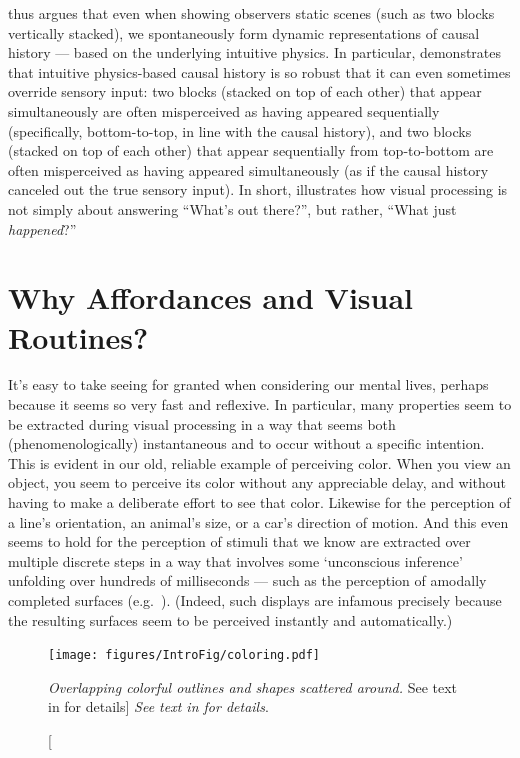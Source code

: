  thus argues that even when showing observers static scenes (such as two blocks vertically stacked), we spontaneously form dynamic representations of causal history --- based on the underlying intuitive physics. In particular,  demonstrates that intuitive physics-based causal history is so robust that it can even sometimes override sensory input: two blocks (stacked on top of each other) that appear simultaneously are often misperceived as having appeared sequentially (specifically, bottom-to-top, in line with the causal history), and two blocks (stacked on top of each other) that appear sequentially from top-to-bottom are often misperceived as having appeared simultaneously (as if the causal history canceled out the true sensory input).  In short,  illustrates how visual processing is not simply about answering “What’s out there?”, but rather, “What just \textit{happened}?”


\section{Why Affordances and Visual Routines?}\label{sec:why_visual_routines}
It’s easy to take seeing for granted when considering our mental lives, perhaps because it seems so very fast and reflexive.  In particular, many properties seem to be extracted during visual processing in a way that seems both (phenomenologically) instantaneous and to occur without a specific intention.   This is evident in our old, reliable example of perceiving color.  When you view an object, you seem to perceive its color without any appreciable delay, and without having to make a deliberate effort to see that color.  Likewise for the perception of a line’s orientation, an animal’s size, or a car’s direction of motion.  And this even seems to hold for the perception of stimuli that we know are extracted over multiple discrete steps in a way that involves some ‘unconscious inference’ unfolding over hundreds of milliseconds — such as the perception of amodally completed surfaces (e.g.~\cite{rauschenberger_masking_2001}).  (Indeed, such displays are infamous precisely because the resulting surfaces seem to be perceived instantly and automatically.)

\begin{figure}
    \centering
    \texttt{[image: figures/IntroFig/coloring.pdf]}
    \caption
    [\textit{Overlapping colorful outlines and shapes scattered around.} See text in  for details]
    {\textit{See text in  for details}.}
    \label{fig:IntroFig_3}
\end{figure}

